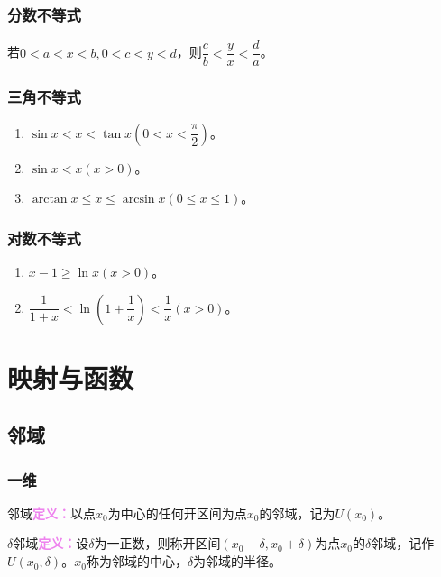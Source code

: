 \documentclass[UTF8, 12pt]{ctexart}
\begin{document}
        \subsubsection{分数不等式}

        若$0<a<x<b,0<c<y<d$，则$\dfrac{c}{b}<\dfrac{y}{x}<\dfrac{d}{a}$。

        \subsubsection{三角不等式}

        \begin{enumerate}
            \item $\sin x<x<\tan x(0<x<\dfrac{\pi}{2})$。
            \item $\sin x<x(x>0)$。
            \item $\arctan x\leqslant x\leqslant\arcsin x(0\leqslant x\leqslant 1)$。
        \end{enumerate}

        \subsubsection{对数不等式}

        \begin{enumerate}
            \item $x-1\geqslant\ln x(x>0)$。
            \item $\dfrac{1}{1+x}<\ln(1+\dfrac{1}{x})<\dfrac{1}{x}(x>0)$。
        \end{enumerate}

        \section{映射与函数}
        \subsection{邻域}
        \subsubsection{一维}

        邻域\textcolor{violet}{\textbf{定义：}}以点$x_0$为中心的任何开区间为点$x_0$的邻域，记为$U(x_0)$。

        $\delta$邻域\textcolor{violet}{\textbf{定义：}}设$\delta$为一正数，则称开区间$(x_0-\delta,x_0+\delta)$为点$x_0$的$\delta$邻域，记作$U(x_0,\delta)$。$x_0$称为邻域的中心，$\delta$为邻域的半径。
\end{document}

